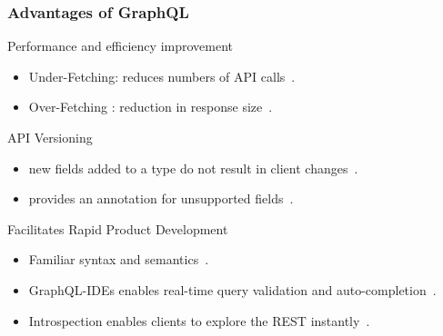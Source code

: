 \begin{frame}\frametitle{Advantages of GraphQL}

\begin{block}{Performance and efficiency improvement}
\begin{itemize}
  \item Under-Fetching: reduces  numbers of API calls~\cite{migrating-to-gql}.
  \item Over-Fetching : reduction in response size~\cite{migrating-to-gql}.
\end{itemize}
\end{block}

\begin{block}{API Versioning}
\begin{itemize}
  \item new fields added to a type do not result in client changes~\cite{migrating-to-gql}. 
  \item provides an  annotation for unsupported fields~\cite{migrating-to-gql}. 
\end{itemize}

\end{block}

\begin{block}{Facilitates Rapid Product Development}


\begin{itemize}
  \item  Familiar syntax and semantics~\cite{rest-vs-gql-controlled-experiment}.
  \item GraphQL-IDEs enables real-time query validation and auto-completion~\cite{rest-vs-gql-controlled-experiment,migrating-to-gql}.
  \item Introspection enables clients to explore the REST instantly~\cite{migrating-to-gql}. 
\end{itemize}

\end{block}


\end{frame}

